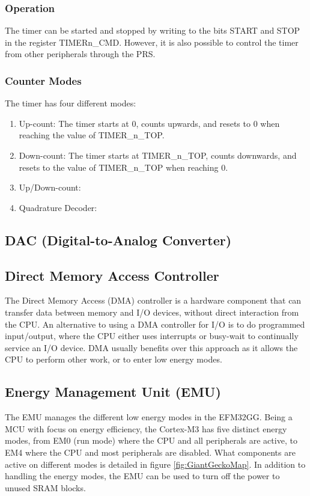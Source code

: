 \subsubsection{Operation}
The timer can be started and stopped by writing to the bits START and STOP in the register TIMERn\_CMD. However, it is also possible to control the timer from other peripherals through the PRS.

\subsubsection{Counter Modes}
The timer has four different modes:
\begin{enumerate}
	\item Up-count: The timer starts at 0, counts upwards, and resets to 0 when reaching the value of TIMER\_n\_TOP.
	\item Down-count: The timer starts at TIMER\_n\_TOP, counts downwards, and resets to the value of TIMER\_n\_TOP when reaching 0.

	\item Up/Down-count: %
	\item Quadrature Decoder:
\end{enumerate}


\subsection{DAC (Digital-to-Analog Converter)}


\subsection{Direct Memory Access Controller}
The Direct Memory Access (DMA) controller is a hardware component that can transfer data between memory and I/O devices, without direct interaction from the CPU. An alternative to using a DMA controller for I/O is to do programmed input/output, where the CPU either uses interrupts or busy-wait to continually service an I/O device. DMA usually benefits over this approach as it allows the CPU to perform other work, or to enter low energy modes.


\subsection{Energy Management Unit (EMU)}\label{subsec:emu}
The EMU manages the different low energy modes in the EFM32GG. Being a MCU with focus on energy efficiency, the Cortex-M3 has five distinct energy modes, from EM0 (run mode) where the CPU and all peripherals are active, to EM4 where the CPU and most peripherals are disabled. What components are active on different modes is detailed in figure \ref{fig:GiantGeckoMap}. In addition to handling the energy modes, the EMU can be used to turn off the power to unused SRAM blocks.\cite{efm32gg-rm}


